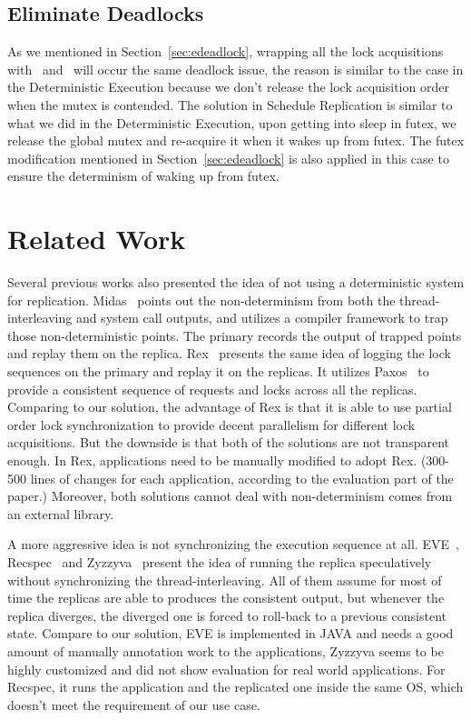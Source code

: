 \subsection{Eliminate Deadlocks} \label{sec:rdeadlock}
As we mentioned in Section~\ref{sec:edeadlock}, wrapping all the lock acquisitions with \detstart\ and \detend\ will occur the same deadlock issue, the reason is similar to the case in the Deterministic Execution because we don't release the lock acquisition order when the mutex is contended. The solution in Schedule Replication is similar to what we did in the Deterministic Execution, upon getting into sleep in futex, we release the global mutex and re-acquire it when it wakes up from futex. The futex modification mentioned in Section~\ref{sec:edeadlock} is also applied in this case to ensure the determinism of waking up from futex.

\section{Related Work}
Several previous works also presented the idea of not using a deterministic system for replication. Midas~\cite{slember2006static} points out the non-determinism from both the thread-interleaving and system call outputs, and utilizes a compiler framework to trap those non-deterministic points. The primary records the output of trapped points and replay them on the replica. Rex~\cite{guo2014rex} presents the same idea of logging the lock sequences on the primary and replay it on the replicas. It utilizes Paxos~\cite{lamport2001paxos} to provide a consistent sequence of requests and locks across all the replicas. Comparing to our solution, the advantage of Rex is that it is able to use partial order lock synchronization to provide decent parallelism for different lock acquisitions. But the downside is that both of the solutions are not transparent enough. In Rex, applications need to be manually modified to adopt Rex. (300-500 lines of changes for each application, according to the evaluation part of the paper.) Moreover, both solutions cannot deal with non-determinism comes from an external library.

A more aggressive idea is not synchronizing the execution sequence at all. EVE~\cite{kapritsos2012all}, Recspec~\cite{lee2010respec} and Zyzzyva~\cite{kotla2007zyzzyva} present the idea of running the replica speculatively without synchronizing the thread-interleaving. All of them assume for most of time the replicas are able to produces the consistent output, but whenever the replica diverges, the diverged one is forced to roll-back to a previous consistent state. Compare to our solution, EVE is implemented in JAVA and needs a good amount of manually annotation work to the applications, Zyzzyva seems to be highly customized and did not show evaluation for real world applications. For Recspec, it runs the application and the replicated one inside the same OS, which doesn't meet the requirement of our use case.